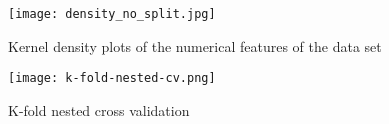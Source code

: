 \begin{figure}[ht]
    \centering
    \texttt{[image: density\_no\_split.jpg]}
    \caption{Kernel density plots of the numerical features of the data set}
    \label{fig:density}
\end{figure}
\begin{figure}[ht]
 \centering
 \texttt{[image: k-fold-nested-cv.png]}
 \caption{K-fold nested cross validation}
 \label{fig:cv}
\end{figure}

